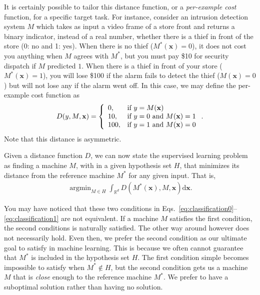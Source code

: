 \documentclass{report}
\newcommand{\vect}[1]{\mathbf{#1}}
\newcommand{\vx}[0]{\vect{x}}
\DeclareMathOperator*{\argmin}{\arg \min}
\begin{document}
It is certainly possible to tailor this distance function, or a {\it
per-example cost} function, for a specific target task. For instance, consider
an intrusion detection system $M$ which takes as input a video frame of a store
front and returns a binary indicator, instead of a real number, whether there is
a thief in front of the store (0: no and 1: yes). When there is no thief
($M^*(\vx)=0$), it does not cost you anything when $M$ agrees with $M^*$, but
you must pay \$10 for security dispatch if $M$ predicted $1$. When there is a
thief in front of your store ($M^*(\vx)=1$), you will lose \$100 if the alarm
fails to detect the thief ($M(\vx)=0$) but will not lose any if the alarm went
off. In this case, we may define the per-example cost function as
\begin{align*}
    D(y, M, \vx) = \left\{
        \begin{array}{l l}
            0, & \text{if }  y=M(\vx) \\
            10, & \text{if }  y=0\text{ and }M(\vx)=1 \\
            100, & \text{if }  y=1\text{ and }M(\vx)=0 
        \end{array}
        \right..
\end{align*}
Note that this distance is asymmetric.

Given a distance function $D$, we can now state the supervised learning
problem as finding a machine $M$, with in a given hypothesis set $H$, that
minimizes its distance from the reference machine $M^*$ for any given input.
That is,
\begin{align}
    \label{eq:classification1}
    \argmin_{M \in H} \int_{\mathbb{R}^d} D(M^*(\vx), M, \vx) \text{d}\vx.
\end{align}

You may have noticed that these two conditions in
Eqs.~\eqref{eq:classification0}--\eqref{eq:classification1} are not equivalent.
If a machine $M$ satisfies the first condition, the second conditions is
naturally satisfied. The other way around however does not necessarily hold.
Even then, we prefer the second condition as our ultimate goal to satisfy in
machine learning. This is because we often cannot guarantee that $M^*$ is
included in the hypothesis set $H$. The first condition simple becomes
impossible to satisfy when $M^* \notin H$, but the second condition gets us a
machine $M$ that is {\it close} enough to the reference machine $M^*$. We prefer
to have a suboptimal solution rather than having no solution.
\end{document}
